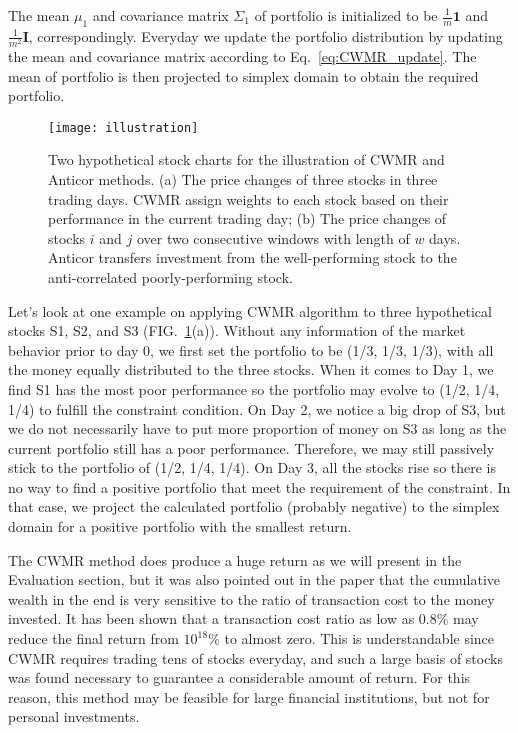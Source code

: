 The mean $\mu_1$ and covariance matrix $\Sigma_1$ of portfolio is initialized to be $\frac{1}{m}\textbf{1}$ and $\frac{1}{m^2}\textbf{I}$, correspondingly. Everyday we update the portfolio distribution by updating the mean and covariance matrix according to Eq.~\ref{eq:CWMR_update}. The mean of portfolio is then projected to simplex domain to obtain the required portfolio.

\begin{figure}
\texttt{[image: illustration]}
\caption{
\label{fig:illustration}
Two hypothetical stock charts for the illustration of CWMR and Anticor methods. (a) The price changes of three stocks in three trading days. CWMR assign weights to each stock based on their performance in the current trading day; (b) The price changes of stocks $i$ and $j$ over two consecutive windows with length of $w$ days. Anticor transfers investment from the well-performing stock to the anti-correlated poorly-performing stock.
}
\end{figure}

Let's look at one example on applying CWMR algorithm to three hypothetical stocks S1, S2, and S3 (FIG.~\ref{fig:illustration}(a)). Without any information of the market behavior prior to day 0, we first set the portfolio to be (1/3, 1/3, 1/3), with all the money equally distributed to the three stocks. When it comes to Day 1, we find S1 has the most poor performance so the portfolio may evolve to (1/2, 1/4, 1/4) to fulfill the constraint condition. On Day 2, we notice a big drop of S3, but we do not necessarily have to put more proportion of money on S3 as long as the current portfolio still has a poor performance. Therefore, we may still passively stick to the portfolio of (1/2, 1/4, 1/4). On Day 3, all the stocks rise so there is no way to find a positive portfolio that meet the requirement of the constraint. In that case, we project the calculated portfolio (probably negative) to the simplex domain for a positive portfolio with the smallest return.

The CWMR method does produce a huge return as we will present in the Evaluation section, but it was also pointed out in the paper that the cumulative wealth in the end is very sensitive to the ratio of transaction cost to the money invested. It has been shown that a transaction cost ratio as low as 0.8\% may reduce the final return from $10^{18}$\% to almost zero. This is understandable since CWMR requires trading tens of stocks everyday, and such a large basis of stocks was found necessary to guarantee a considerable amount of return. For this reason, this method may be feasible for large financial institutions, but not for personal investments.

